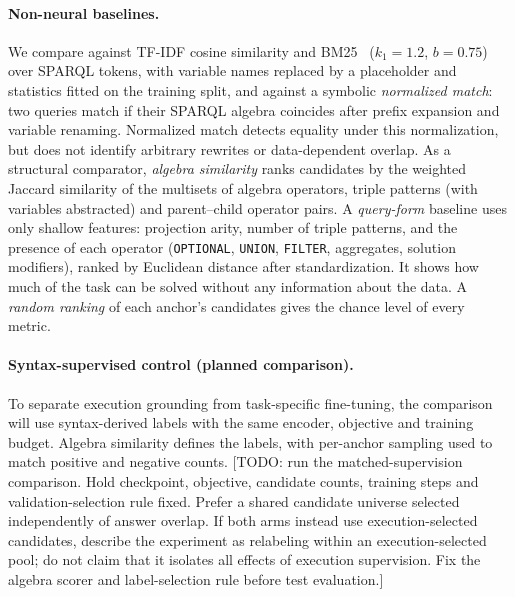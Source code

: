 \documentclass[runningheads]{llncs}
\newcommand{\hp}[1]{{\color{red!75!black}#1}}
\begin{document}
\paragraph{Non-neural baselines.}
We compare against TF-IDF cosine similarity and BM25~\cite{robertson2009bm25}
($k_1=1.2$, $b=0.75$) over SPARQL tokens, with variable names replaced by a
placeholder and statistics fitted on the training split, and against a
symbolic \emph{normalized match}: two queries match if their SPARQL algebra
coincides after prefix expansion and variable renaming. Normalized match
detects equality under this normalization, but does not identify arbitrary
rewrites or data-dependent overlap. As a structural comparator,
\emph{algebra similarity} ranks candidates by the weighted Jaccard
similarity of the multisets of algebra operators, triple patterns (with
variables abstracted) and parent--child operator pairs. A \emph{query-form}
baseline uses only shallow features: projection arity, number of triple
patterns, and the presence of each operator (\texttt{OPTIONAL},
\texttt{UNION}, \texttt{FILTER}, aggregates, solution modifiers), ranked by
Euclidean distance after standardization. It shows how much of the task can
be solved without any information about the data. A \emph{random ranking} of each anchor's
candidates gives the chance level of every metric.

\paragraph{Syntax-supervised control (planned comparison).}
To separate execution grounding from task-specific fine-tuning, the comparison
will use syntax-derived labels with the same encoder, objective and training
budget. Algebra similarity defines the labels, with per-anchor sampling used
to match positive and negative counts.
\hp{[TODO: run the matched-supervision comparison. Hold checkpoint,
objective, candidate counts, training steps and validation-selection rule
fixed. Prefer a shared candidate universe selected independently of answer
overlap. If both arms instead use execution-selected candidates, describe
the experiment as relabeling within an execution-selected pool; do not claim
that it isolates all effects of execution supervision. Fix the algebra
scorer and label-selection rule before test evaluation.]}
\end{document}
